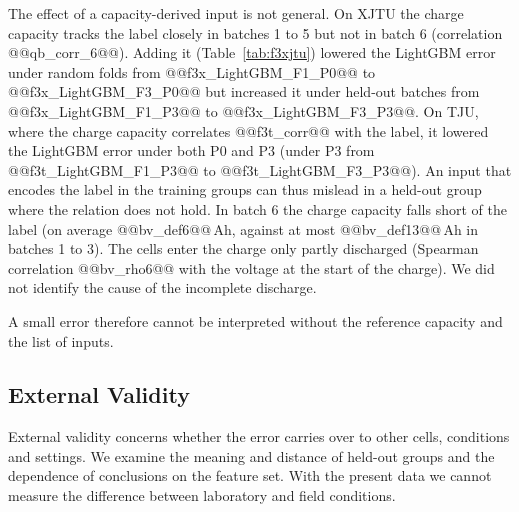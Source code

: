 \documentclass{ieeeaccess}
\newcommand{\fitcol}[1]{\footnotesize\resizebox{\ifdim\width>\columnwidth\columnwidth\else\width\fi}{!}{}}
\begin{document}
The effect of a capacity-derived input is not general. On XJTU the charge capacity tracks the label closely in batches 1 to 5 but not in batch 6 (correlation @@qb_corr_6@@). Adding it (Table~\ref{tab:f3xjtu}) lowered the LightGBM error under random folds from @@f3x_LightGBM_F1_P0@@ to @@f3x_LightGBM_F3_P0@@ but increased it under held-out batches from @@f3x_LightGBM_F1_P3@@ to @@f3x_LightGBM_F3_P3@@. On TJU, where the charge capacity correlates @@f3t_corr@@ with the label, it lowered the LightGBM error under both P0 and P3 (under P3 from @@f3t_LightGBM_F1_P3@@ to @@f3t_LightGBM_F3_P3@@). An input that encodes the label in the training groups can thus mislead in a held-out group where the relation does not hold. In batch 6 the charge capacity falls short of the label (on average @@bv_def6@@\,Ah, against at most @@bv_def13@@\,Ah in batches 1 to 3). The cells enter the charge only partly discharged (Spearman correlation @@bv_rho6@@ with the voltage at the start of the charge). We did not identify the cause of the incomplete discharge.
\begin{table}[!tb]
\centering
\caption{XJTU and TJU: pooled RMSE (\% SOH) with F1 (left) and with F3 = F1 plus charge capacity (right).}
\label{tab:f3xjtu}
\scriptsize
\fitcol{tables/f3xjtu.tex}
\end{table}

A small error therefore cannot be interpreted without the reference capacity and the list of inputs.

\subsection{External Validity}
\label{sec:external}
External validity concerns whether the error carries over to other cells, conditions and settings. We examine the meaning and distance of held-out groups and the dependence of conclusions on the feature set. With the present data we cannot measure the difference between laboratory and field conditions.
\end{document}
